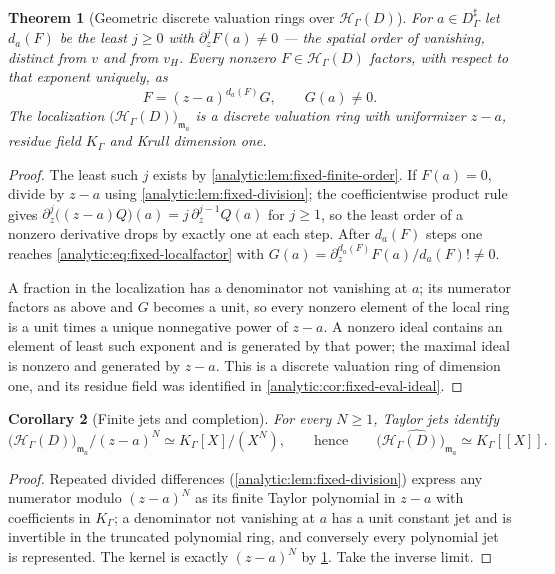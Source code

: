 \documentclass[11pt,letterpaper]{article}
\newtheorem{theorem}{Theorem}[section]
\newtheorem{corollary}[theorem]{Corollary}
\theoremstyle{definition}
\theoremstyle{remark}
\newcommand{\HH}{\mathcal H}
\newcommand{\m}{\mathfrak m}
\newcommand{\vH}{v_{\!H}}
\numberwithin{equation}{section}
\begin{document}
\begin{theorem}[Geometric discrete valuation rings over $\HH_\Gamma(D)$]
\label{analytic:thm:fixed-dvr}
For $a\in D^\sharp_\Gamma$ let $d_a(F)$ be the least $j\ge0$ with
$\partial_z^jF(a)\ne0$ --- the \emph{spatial} order of vanishing, distinct
from $v$ and from $\vH$. Every nonzero $F\in\HH_\Gamma(D)$ factors, with
respect to that exponent uniquely, as
\begin{equation}\label{analytic:eq:fixed-localfactor}
 F=(z-a)^{d_a(F)}G,\qquad G(a)\ne0 .
\end{equation}
The localization $\bigl(\HH_\Gamma(D)\bigr)_{\m_a}$ is a discrete
valuation ring with uniformizer $z-a$, residue field $K_\Gamma$ and Krull
dimension one.
\end{theorem}
\begin{proof}
The least such $j$ exists by \cref{analytic:lem:fixed-finite-order}. If
$F(a)=0$, divide by $z-a$ using \cref{analytic:lem:fixed-division}; the
coefficientwise product rule gives
$\partial_z^j\bigl((z-a)Q\bigr)(a)=j\,\partial_z^{j-1}Q(a)$ for $j\ge1$,
so the least order of a nonzero derivative drops by exactly one at each
step. After $d_a(F)$ steps one reaches
\eqref{analytic:eq:fixed-localfactor} with
$G(a)=\partial_z^{d_a(F)}F(a)/d_a(F)!\ne0$.

A fraction in the localization has a denominator not vanishing at $a$; its
numerator factors as above and $G$ becomes a unit, so every nonzero
element of the local ring is a unit times a unique nonnegative power of
$z-a$. A nonzero ideal contains an element of least such exponent and is
generated by that power; the maximal ideal is nonzero and generated by
$z-a$. This is a discrete valuation ring of dimension one, and its residue
field was identified in \cref{analytic:cor:fixed-eval-ideal}.
\end{proof}

\begin{corollary}[Finite jets and completion]
\label{analytic:cor:fixed-completion}
For every $N\ge1$, Taylor jets identify
\[
 \bigl(\HH_\Gamma(D)\bigr)_{\m_a}/(z-a)^N\simeq K_\Gamma[X]/(X^N),
 \qquad\text{hence}\qquad
 \widehat{\bigl(\HH_\Gamma(D)\bigr)_{\m_a}}\simeq K_\Gamma[[X]] .
\]
\end{corollary}
\begin{proof}
Repeated divided differences (\cref{analytic:lem:fixed-division}) express
any numerator modulo $(z-a)^N$ as its finite Taylor polynomial in $z-a$
with coefficients in $K_\Gamma$; a denominator not vanishing at $a$ has a
unit constant jet and is invertible in the truncated polynomial ring, and
conversely every polynomial jet is represented. The kernel is exactly
$(z-a)^N$ by \cref{analytic:thm:fixed-dvr}. Take the inverse limit.
\end{proof}
\end{document}
